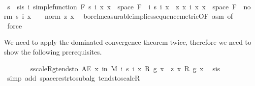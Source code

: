 \begin{isabellebody}
\ \ \ \ \isamarkupfalse%
\ {\isacharminus}{\kern0pt}\isanewline
\ \ \ \ \ \ \isamarkupfalse%
\ s\ \ s{\isacharunderscore}{\kern0pt}is{\isacharcolon}{\kern0pt}\ {\isachardoublequoteopen}{\isasymAnd}i{\isachardot}{\kern0pt}\ simple{\isacharunderscore}{\kern0pt}function\ {\isacharquery}{\kern0pt}F\ {\isacharparenleft}{\kern0pt}s\ i{\isacharparenright}{\kern0pt}{\isachardoublequoteclose}\ {\isachardoublequoteopen}{\isasymAnd}x{\isachardot}{\kern0pt}\ x\ {\isasymin}\ space\ {\isacharquery}{\kern0pt}F\ {\isasymLongrightarrow}\ {\isacharparenleft}{\kern0pt}{\isasymlambda}i{\isachardot}{\kern0pt}\ s\ i\ x{\isacharparenright}{\kern0pt}\ {\isasymlonglonglongrightarrow}\ z\ x{\isachardoublequoteclose}\ {\isachardoublequoteopen}{\isasymAnd}i\ x{\isachardot}{\kern0pt}\ x\ {\isasymin}\ space\ {\isacharquery}{\kern0pt}F\ {\isasymLongrightarrow}\ norm\ {\isacharparenleft}{\kern0pt}s\ i\ x{\isacharparenright}{\kern0pt}\ {\isasymle}\ {}\ {\isacharasterisk}{\kern0pt}\ norm\ {\isacharparenleft}{\kern0pt}z\ x{\isacharparenright}{\kern0pt}{\isachardoublequoteclose}\ \isamarkupfalse%
\ borel{\isacharunderscore}{\kern0pt}measurable{\isacharunderscore}{\kern0pt}implies{\isacharunderscore}{\kern0pt}sequence{\isacharunderscore}{\kern0pt}metric{\isacharbrackleft}{\kern0pt}OF\ asm{\isacharparenleft}{\kern0pt}{}{\isacharparenright}{\kern0pt}{\isacharcomma}{\kern0pt}\ of\ {}{\isacharbrackright}{\kern0pt}\ \isamarkupfalse%
\ force%
\begin{isamarkuptext}%
We need to apply the dominated convergence theorem twice, therefore we need to show the following prerequisites.%
\end{isamarkuptext}\isamarkuptrue%
\ \ \ \ \ \ \isamarkupfalse%
\ s{\isacharunderscore}{\kern0pt}scaleR{\isacharunderscore}{\kern0pt}g{\isacharunderscore}{\kern0pt}tendsto{\isacharcolon}{\kern0pt}\ {\isachardoublequoteopen}AE\ x\ in\ M{\isachardot}{\kern0pt}\ {\isacharparenleft}{\kern0pt}{\isasymlambda}i{\isachardot}{\kern0pt}\ s\ i\ x\ {\isacharasterisk}{\kern0pt}\isactrlsub R\ g\ x{\isacharparenright}{\kern0pt}\ {\isasymlonglonglongrightarrow}\ z\ x\ {\isacharasterisk}{\kern0pt}\isactrlsub R\ g\ x{\isachardoublequoteclose}\ \isamarkupfalse%
\ s{\isacharunderscore}{\kern0pt}is{\isacharparenleft}{\kern0pt}{}{\isacharparenright}{\kern0pt}\ \isamarkupfalse%
\ {\isacharparenleft}{\kern0pt}simp\ add{\isacharcolon}{\kern0pt}\ space{\isacharunderscore}{\kern0pt}restr{\isacharunderscore}{\kern0pt}to{\isacharunderscore}{\kern0pt}subalg\ tendsto{\isacharunderscore}{\kern0pt}scaleR{\isacharparenright}{\kern0pt}\isanewline

\end{isabellebody}
